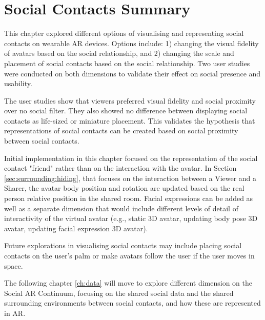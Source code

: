 \pagebreak
\section{Social Contacts Summary}

This chapter explored different options of visualising and representing social contacts on wearable AR devices. Options include: 1) changing the visual fidelity of avatars based on the social relationship, and 2) changing the scale and placement of social contacts based on the social relationship. Two user studies were conducted on both dimensions to validate their effect on social presence and usability. 

The user studies show that viewers preferred visual fidelity and social proximity over no social filter. They also showed no difference between displaying social contacts as life-sized or miniature placement. This validates the hypothesis that representations of social contacts can be created based on social proximity between social contacts. 

Initial implementation in this chapter focused on the representation of the social contact "friend" rather than on the interaction with the avatar. In Section \ref{sec:surrounding:hiding}, that focuses on the interaction between a Viewer and a Sharer, the avatar body position and rotation are updated based on the real person relative position in the shared room. Facial expressions can be added as well as a separate dimension that would include different levels of detail of interactivity of the virtual avatar (e.g., static 3D avatar, updating body pose 3D avatar, updating facial expression 3D avatar).

Future explorations in visualising social contacts may include placing social contacts on the user's palm or make avatars follow the user if the user moves in space. 

The following chapter \ref{ch:data} will move to explore different dimension on the Social AR Continuum, focusing on the shared social data and the shared surrounding environments between social contacts, and how these are represented in AR. 


